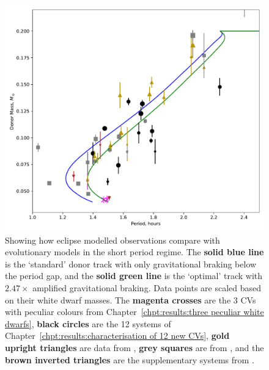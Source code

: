\begin{figure}
    \centering
    \includegraphics[width=\textwidth]{figures/results/K11_donor_track_with_eclipse_modelled_data.pdf}
    \caption{Showing how eclipse modelled observations compare with evolutionary models in the short period regime. The {\bf solid blue line} is the `standard' \citet{knigge11} donor track with only gravitational braking below the period gap, and the {\bf solid green line} is the `optimal' track with $2.47\times$ amplified gravitational braking. Data points are scaled based on their white dwarf masses. The {\bf magenta crosses} are the 3 CVs with peculiar colours from Chapter~\ref{chpt:results:three peculiar white dwarfs}, {\bf black circles} are the 12 systems of Chapter~\ref{chpt:results:characterisation of 12 new CVs}, {\bf gold upright triangles} are data from \citet{McAllister2019}, {\bf grey squares} are from \citet{Savoury2011}, and the {\bf brown inverted triangles} are the supplementary systems from \citet{copperwheat2010,mcallister2015,mcallister2017,mcallister2017b}.}
    \label{fig:12 new cvs:donor model with eclipsers plotted}
\end{figure}

